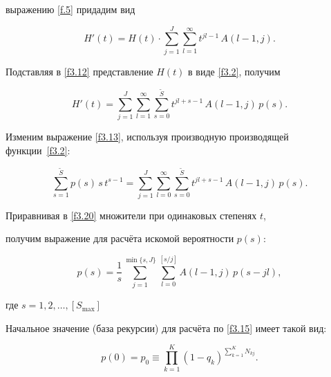 выражению \eqref{f.5} придадим вид

\begin{equation}

\label{f3.12}

H'(t)=H(t)\cdot \sum_{j=1}^{J}\sum_{l=1}^{\infty} t^{jl-1} \, A(l-1, j).

\end{equation}



Подставляя в \eqref{f3.12} представление $H(t)$ в виде \eqref{f3.2}, получим

\begin{equation}

\label{f3.13}

H'(t)=\sum_{j=1}^{J}\sum_{l=1}^{\infty}\sum_{s=0}^{\widetilde{S}}t^{jl+s-1} \, A(l-1, j) \, p(s).

\end{equation}

Изменим выражение \eqref{f3.13}, используя производную производящей функции~\eqref{f3.2}:

\begin{equation}

\label{f3.20}

\sum_{s=1}^{\widetilde{S}}p(s) \, s \, t^{s-1}=

\sum_{j=1}^{J}\sum_{l=0}^{\infty}\sum_{s=0}^{\widetilde{S}}t^{jl+s-1} \, A(l-1, j)\, p(s).

\end{equation}

Приравнивая в \eqref{f3.20} множители при одинаковых степенях $t$, %

получим выражение для расчёта искомой вероятности $p(s)$:

\begin{equation}

\label{f3.15}

p(s)=\frac{1}{s}\sum_{j=1}^{\min\{s, J\}}\sum_{l=0}^{[{s}/{j}]} A(l-1, j) \, p(s-j l),

\end{equation}

где $s = 1, 2, \dots, [S_{\max}]$



Начальное значение (база рекурсии) для расчёта по \eqref{f3.15} имеет такой вид:

\begin{equation}

\label{f3.16}

p(0)=p_0\equiv\prod_{k=1}^{K} (1-q_k)^{\sum_{k=1}^{K}N_{kj}}.

\end{equation}



